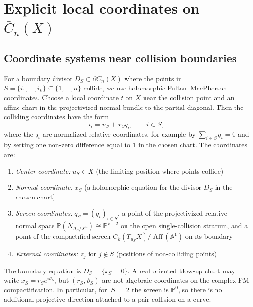 \section{\texorpdfstring{Explicit local coordinates on $\overline{C}_n(X)$}{Explicit local coordinates on C n(X)}}
\label{sec:explicit-coordinates-complete}

\subsection{Coordinate systems near collision boundaries}

\begin{convention}\label{conv:coordinate-notation}
For a boundary divisor $D_S \subset \partial\overline{C}_n(X)$ where
the points in
$S = \{i_1, \ldots, i_k\} \subseteq \{1,\ldots,n\}$ collide, we use
holomorphic Fulton--MacPherson coordinates. Choose a local coordinate
$t$ on $X$ near the collision point and an affine chart in the
projectivized normal bundle to the partial diagonal. Then the colliding
coordinates have the form
\[
t_i=u_S+x_S q_i,\qquad i\in S,
\]
where the $q_i$ are normalized relative coordinates, for example by
$\sum_{i\in S}q_i=0$ and by setting one non-zero difference equal to
$1$ in the chosen chart. The coordinates are:

\begin{enumerate}
\item \emph{Center coordinate:} $u_S \in X$ (the limiting position where points collide)

\item \emph{Normal coordinate:} $x_S$ (a holomorphic equation for the
divisor $D_S$ in the chosen chart)

\item \emph{Screen coordinates:} $q_S=(q_i)_{i\in S}$, a point of the
projectivized relative normal space
$\mathbb{P}(N_{\Delta_S/X^n})\cong\mathbb{P}^{k-2}$ on the open
single-collision stratum, and a point of the compactified screen
$\overline{C}_k(T_{u_S}X)/\operatorname{Aff}(\mathbb{A}^1)$ on its
boundary

\item \emph{External coordinates:} $z_j$ for $j \notin S$ (positions of non-colliding points)
\end{enumerate}

The boundary equation is $D_S=\{x_S=0\}$. A real oriented blow-up chart
may write $x_S=r_Se^{i\vartheta_S}$, but $(r_S,\vartheta_S)$ are not
algebraic coordinates on the complex FM compactification. In
particular, for $|S|=2$ the screen is $\mathbb P^0$, so there is no
additional projective direction attached to a pair collision on a
curve.


\end{convention}
